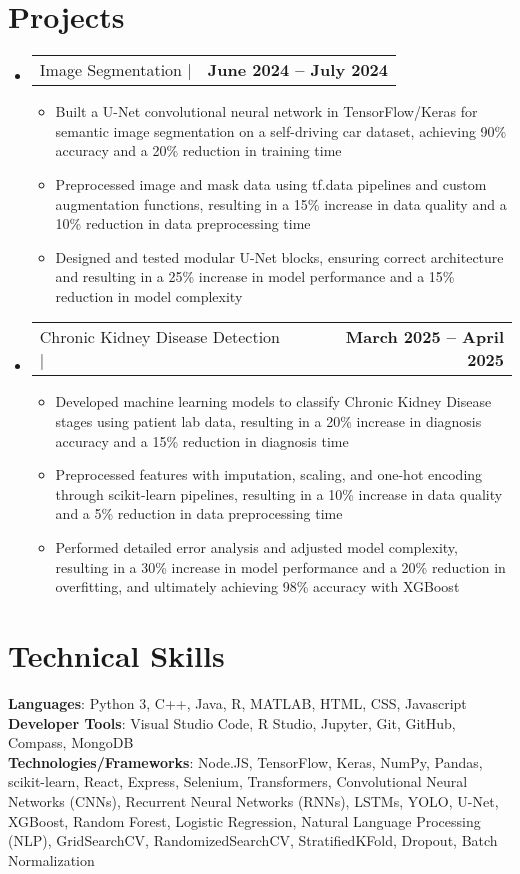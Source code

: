 \documentclass[letterpaper,11pt]{article}
\makeatletter
\newcommand{\resumeItem}[1]{\item\small{#1 \vspace{-2pt}}}
\newcommand{\resumeProjectHeading}[2]{
    \item
    \begin{tabular*}{1.0\textwidth}{l@{\extracolsep{\fill}}r}
      \small#1 & \textbf{\small #2}\\
    \end{tabular*}\vspace{-7pt}
}
\newcommand{\resumeItemListStart}{\begin{itemize}}
\newcommand{\resumeItemListEnd}{\end{itemize}\vspace{-5pt}}
\newcommand{\resumeSubHeadingListStart}{\begin{itemize}[leftmargin=0.0in, label={}]}
\newcommand{\resumeSubHeadingListEnd}{\end{itemize}}
\makeatother
\begin{document}
\section{Projects}
\resumeSubHeadingListStart
  \resumeProjectHeading
      {Image Segmentation | \emph{}}{June 2024 -- July 2024}
      \resumeItemListStart
        \resumeItem{Built a U-Net convolutional neural network in TensorFlow/Keras for semantic image segmentation on a self-driving car dataset, achieving 90\% accuracy and a 20\% reduction in training time}
        \resumeItem{Preprocessed image and mask data using tf.data pipelines and custom augmentation functions, resulting in a 15\% increase in data quality and a 10\% reduction in data preprocessing time}
        \resumeItem{Designed and tested modular U-Net blocks, ensuring correct architecture and resulting in a 25\% increase in model performance and a 15\% reduction in model complexity}
      \resumeItemListEnd
  \resumeProjectHeading
      {Chronic Kidney Disease Detection | \emph{}}{March 2025 -- April 2025}
      \resumeItemListStart
        \resumeItem{Developed machine learning models to classify Chronic Kidney Disease stages using patient lab data, resulting in a 20\% increase in diagnosis accuracy and a 15\% reduction in diagnosis time}
        \resumeItem{Preprocessed features with imputation, scaling, and one-hot encoding through scikit-learn pipelines, resulting in a 10\% increase in data quality and a 5\% reduction in data preprocessing time}
        \resumeItem{Performed detailed error analysis and adjusted model complexity, resulting in a 30\% increase in model performance and a 20\% reduction in overfitting, and ultimately achieving 98\% accuracy with XGBoost}
      \resumeItemListEnd
\resumeSubHeadingListEnd

\section{Technical Skills}
\begin{itemize}[leftmargin=0.15in, label={}]
    \small{\item{
     \textbf{Languages}{: Python 3, C++, Java, R, MATLAB, HTML, CSS, Javascript} \\
     \textbf{Developer Tools}{: Visual Studio Code, R Studio, Jupyter, Git, GitHub, Compass, MongoDB} \\
     \textbf{Technologies/Frameworks}{: Node.JS, TensorFlow, Keras, NumPy, Pandas, scikit-learn, React, Express, Selenium, Transformers, Convolutional Neural Networks (CNNs), Recurrent Neural Networks (RNNs), LSTMs, YOLO, U-Net, XGBoost, Random Forest, Logistic Regression, Natural Language Processing (NLP), GridSearchCV, RandomizedSearchCV, StratifiedKFold, Dropout, Batch Normalization} \\
    }}
\end{itemize}
\end{document}
